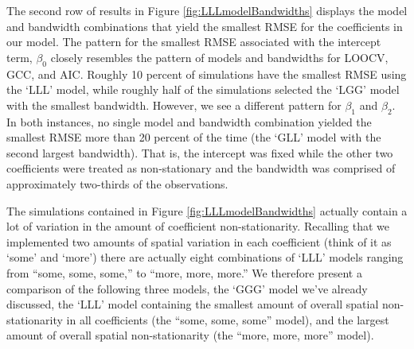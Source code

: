 \documentclass{article}\usepackage[]{graphicx}\usepackage[]{color}
\begin{document}
The second row of results in Figure \ref{fig:LLLmodelBandwidths} displays the model and bandwidth combinations that yield the smallest RMSE for the coefficients in our model. The pattern for the smallest RMSE associated with the intercept term, $\beta _0$ closely resembles the pattern of models and bandwidths for LOOCV, GCC, and AIC. Roughly 10 percent of simulations have the smallest RMSE using the `LLL' model, while roughly half of the simulations selected the `LGG' model with the smallest bandwidth. However, we see a different pattern for $\beta _1$ and $\beta _2$. In both instances, no single model and bandwidth combination yielded the smallest RMSE more than 20 percent of the time (the `GLL' model with the second largest bandwidth). That is, the intercept was fixed while the other two coefficients were treated as non-stationary and the bandwidth was comprised of approximately two-thirds of the observations. 

The simulations contained in Figure \ref{fig:LLLmodelBandwidths} actually contain a lot of variation in the amount of coefficient non-stationarity. Recalling that we implemented two amounts of spatial variation in each coefficient (think of it as `some' and `more') there are actually eight combinations of `LLL' models ranging from ``some, some, some,'' to ``more, more, more.'' We therefore present a comparison of the following three models, the `GGG' model we've already discussed, the `LLL' model containing the smallest amount of overall spatial non-stationarity in all coefficients (the ``some, some, some'' model), and the largest amount of overall spatial non-stationarity (the ``more, more, more'' model).
\end{document}
